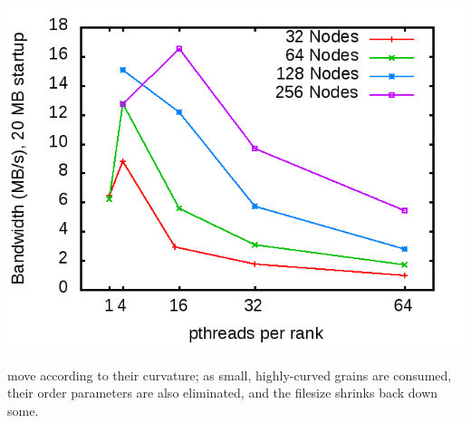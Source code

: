 \documentclass[11pt]{article}
\begin{document}
\begin{multicols*}{2}
\begin{center}
\begin{minipage}{0.4\textwidth}
  \includegraphics[width=\textwidth]{img/pr-initBW}
\end{minipage}
\end{center}
move according to their curvature;
as small, highly-curved grains are consumed, their order parameters are also eliminated, and the filesize shrinks back down some.


\end{multicols*}
\end{document}

